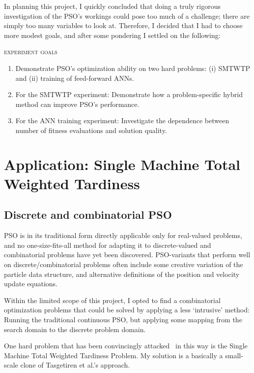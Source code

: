 \documentclass[a4paper,final,9pt]{article}
\begin{document}
In planning this project, I quickly concluded that doing a truly rigorous
investigation of the PSO's workings could pose too much of a challenge; there
are simply too many variables to look at. Therefore, I decided that I had to
choose more modest goals, and after some pondering I settled on the following:

\begin{framed}
  \textsc{experiment goals}
  \begin{enumerate}
    \item Demonstrate PSO's optimization ability on two hard problems:
      (i) SMTWTP and (ii) training of feed-forward ANNs.
    \item For the SMTWTP experiment: Demonstrate how a problem-specific hybrid method can
      improve PSO's performance.
    \item For the ANN training experiment: Investigate the dependence between
      number of fitness evaluations and solution quality.
   \end{enumerate}
\end{framed}


\section{Application: Single Machine Total Weighted Tardiness}
\label{sec:anal1}

\subsection{Discrete and combinatorial PSO}
PSO is in its traditional form directly applicable only for real-valued
problems, and no one-size-fits-all method for adapting it to discrete-valued
and combinatorial problems have yet been discovered. 
PSO-variants that perform well on discrete/combinatorial problems often
include some creative variation of the particle data structure, and
alternative definitions of the position and velocity update equations.  

Within the limited scope of this project, I opted to find a combinatorial
optimization problems that could be solved by applying a less `intrusive'
method: Running the traditional continuous PSO, but applying some mapping from
the search domain to the discrete problem domain.

One hard problem that has been convincingly attacked~\cite{tardiness} in this
way is the Single Machine Total Weighted Tardiness Problem. My solution is a
basically a small-scale clone of Tasgetiren et al.'s approach.
\end{document}
